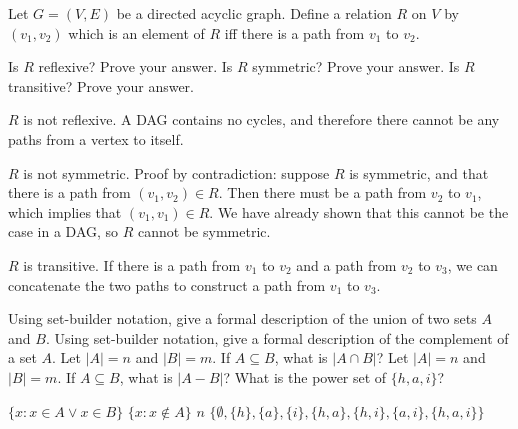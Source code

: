 \documentclass[solution, letterpaper]{cs20exam}
\begin{document}
\problem{}{}
Let $G = (V, E)$ be a directed acyclic graph. Define a relation $R$ on $V$ by $(v_1, v_2)$ which is an element of $R$ iff there is a path from $v_1$ to $v_2$.

\subproblem Is $R$ reflexive? Prove your answer.
\subproblem Is $R$ symmetric? Prove your answer.
\subproblem Is $R$ transitive? Prove your answer.

\begin{solution}

\subsolution $R$ is not reflexive. A DAG contains no cycles, and therefore there cannot be any paths from a vertex to itself.

\subsolution $R$ is not symmetric. Proof by contradiction: suppose $R$ is symmetric, and that there is a path from $(v_1, v_2) \in R$. Then there must be a path from $v_2$ to $v_1$, which implies that $(v_1, v_1) \in R$. We have already shown that this cannot be the case in a DAG, so $R$ cannot be symmetric.

\subsolution $R$ is transitive. If there is a path from $v_1$ to $v_2$ and a path from $v_2$ to $v_3$, we can concatenate the two paths to construct a path from $v_1$ to $v_3$.

\end{solution}


\pagebreak


\problem{}{}

\subproblem Using set-builder notation, give a formal description of the union of two sets $A$ and $B$. %
\subproblem Using set-builder notation, give a formal description of the complement of a set $A$. %
\subproblem Let $|A| = n$ and $|B| = m$. If $A \subseteq B$, what is $|A \cap B|$? %
\subproblem Let $|A| = n$ and $|B| = m$. If $A \subseteq B$, what is $|A - B|$? %
\subproblem What is the power set of $\{ h, a, i\}$? %

\begin{solution}
\subsolution $\{x : x \in A \vee x \in B\}$
\subsolution $\{x : x \notin A\}$
\subsolution $n$
\subsolution $\{\emptyset, \{h\}, \{a\}, \{i\}, \{h, a\}, \{h, i\}, \{a, i\}, \{h, a, i\} \}$
\end{solution}
\end{document}
